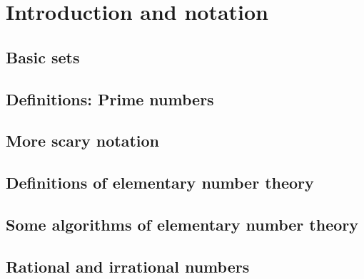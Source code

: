 
\chapter{Introduction and notation}

\section{Basic sets}



\newpage

\section{Definitions: Prime numbers}




\newpage

\section{More scary notation}




\newpage


\section{Definitions of elementary number theory}




\newpage

\section[Some algorithms]{Some algorithms of elementary number theory}




\newpage

\section{Rational and irrational numbers}

